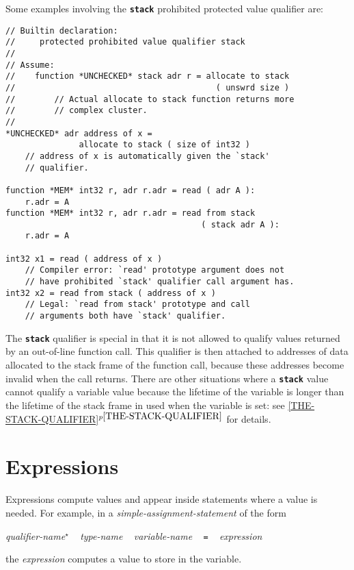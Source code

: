 \documentclass[12pt]{article}
\newcommand{\TT}[1]{{\tt \bfseries #1}}
\newcommand{\itemref}[1]{\ref{#1}$^{p\pageref{#1}}$}
\newcommand{\STAR}{{\Large $^\star$}}
\newenvironment{indpar}[1][0.3in]%
	{\begin{list}{}%
		     {\setlength{\itemsep}{0in}%
		      \setlength{\topsep}{0in}%
		      \setlength{\parsep}{1ex}%
		      \setlength{\labelwidth}{#1}%
		      \setlength{\leftmargin}{#1}%
		      \addtolength{\leftmargin}{\labelsep}}%
	 \item}%
	{\end{list}}
\begin{document}
Some examples involving the \TT{stack} prohibited protected value
qualifier are:
\begin{indpar}\begin{verbatim}
// Builtin declaration:
//     protected prohibited value qualifier stack
//
// Assume:
//    function *UNCHECKED* stack adr r = allocate to stack
//                                         ( unswrd size )
//        // Actual allocate to stack function returns more
//        // complex cluster.
//
*UNCHECKED* adr address of x =
               allocate to stack ( size of int32 )
    // address of x is automatically given the `stack'
    // qualifier.

function *MEM* int32 r, adr r.adr = read ( adr A ):
    r.adr = A
function *MEM* int32 r, adr r.adr = read from stack
                                        ( stack adr A ):
    r.adr = A

int32 x1 = read ( address of x )
    // Compiler error: `read' prototype argument does not
    // have prohibited `stack' qualifier call argument has.
int32 x2 = read from stack ( address of x )
    // Legal: `read from stack' prototype and call
    // arguments both have `stack' qualifier.
\end{verbatim}\end{indpar}

The \TT{stack} qualifier is special in that it is not allowed to qualify
values returned by an out-of-line function call.
This qualifier is then attached to addresses of data allocated
to the stack frame of the function call, because these addresses become
invalid when the call returns.  There are other situations where
a \TT{stack} value cannot qualify a variable value because the
lifetime of the variable is longer than the lifetime of the
stack frame in used when the variable is set:
see \itemref{THE-STACK-QUALIFIER} for details.

\section{Expressions}
\label{EXPRESSIONS}

Expressions compute values and appear inside statements where a value is needed.
For example, in a {\em simple-assignment-statement} of the form
\begin{indpar}
{\em qualifier-name}\STAR{} ~ {\em type-name} ~ {\em variable-name}
	~ {\tt =} ~ {\em expression}
\end{indpar}
the {\em expression} computes a value to store in the variable.
\end{document}
